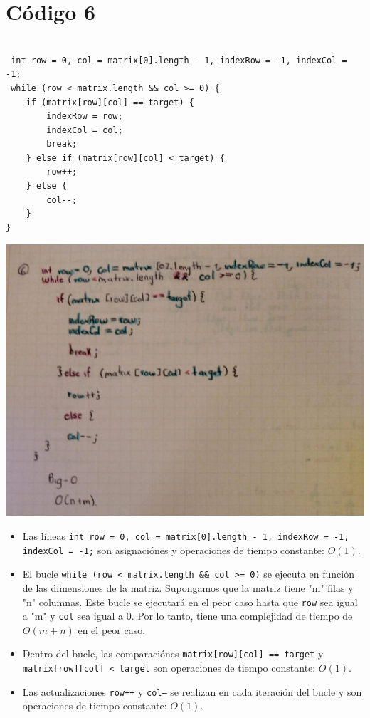 \documentclass[a4paper,onecolumn,10pt]{article}
\begin{document}
\section{Código 6}

\begin{verbatim}

 int row = 0, col = matrix[0].length - 1, indexRow = -1, indexCol = -1; 
 while (row < matrix.length && col >= 0) {
    if (matrix[row][col] == target) {
        indexRow = row;
        indexCol = col;
        break;
    } else if (matrix[row][col] < target) {
        row++;
    } else {
        col--;
    }
}

\end{verbatim}

\includegraphics[width=1\linewidth]{imagenes/punto 6.jpeg}
\\

\begin{itemize}

    \item Las líneas \texttt{int row = 0, col = matrix[0].length - 1, indexRow = -1, indexCol = -1;} son asignaciónes y operaciones de tiempo constante: $O(1)$.

    \item El bucle \texttt{while (row < matrix.length \&\& col >= 0)} se ejecuta en función de las dimensiones de la matriz. Supongamos que la matriz tiene "m" filas y "n" columnas. Este bucle se ejecutará en el peor caso hasta que \texttt{row} sea igual a "m" y \texttt{col} sea igual a 0. Por lo tanto, tiene una complejidad de tiempo de $O(m + n)$ en el peor caso.

   \item Dentro del bucle, las comparaciónes \texttt{matrix[row][col] == target} y \texttt{matrix[row][col] < target} son operaciones de tiempo constante: $O(1)$.

   \item Las actualizaciones \texttt{row++} y \texttt{col--} se realizan en cada iteración del bucle y son operaciones de tiempo constante: $O(1)$.

\end{itemize}
\end{document}
